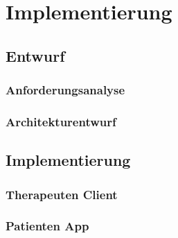 \chapter{Implementierung}\label{Implementierung}
\section{Entwurf}
\subsection{Anforderungsanalyse}

\subsection{Architekturentwurf}

\section{Implementierung}

\subsection{Therapeuten Client}

\subsection{Patienten App}
